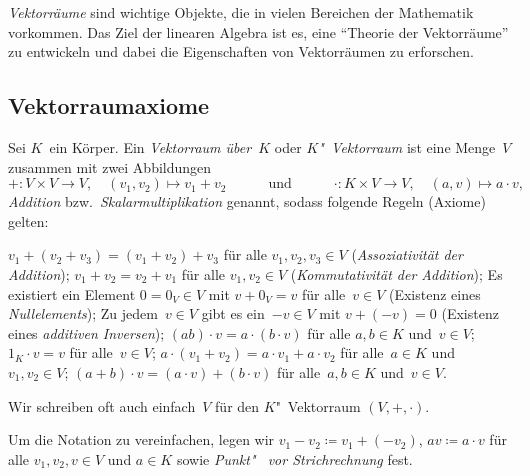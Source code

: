 \documentclass[a4paper]{article}
\begin{document}
\emph{Vektorräume} sind wichtige Objekte, die in vielen Bereichen der Mathematik vorkommen. Das Ziel der linearen Algebra ist es, eine "`Theorie der Vektorräume"' zu entwickeln und dabei die Eigenschaften von Vektorräumen zu erforschen.

\subsection{Vektorraumaxiome}

\begin{definition}[Vektorraum]
    Sei $K$~ein Körper.  Ein \emph{Vektorraum über~$K$} oder \emph{$K$"~Vektorraum} ist eine Menge~$V$ zusammen mit zwei Abbildungen
    \begin{equation*}
        +\colon V \times V \to V,\quad (v_1, v_2) \mapsto v_1+v_2 \quad\qquad\text{und}\qquad\quad \cdot\colon K \times V \to V,\quad (a, v) \mapsto a\cdot v,
    \end{equation*}
    \emph{Addition} bzw.\ \emph{Skalarmultiplikation} genannt, sodass folgende Regeln (Axiome) gelten:
    \begin{enumerate}[leftmargin=*, widest=(SM0)]
         $v_1+(v_2+v_3) = (v_1+v_2)+v_3$ für alle $v_1, v_2, v_3 \in V$ (\emph{Assoziativität der Addition});\label{ax:vecspace:aa}
         $v_1+v_2 = v_2+v_1$ für alle $v_1, v_2 \in V$ (\emph{Kommutativität der Addition});\label{ax:vecspace:ac}
         Es existiert ein Element $0 = 0_V \in V$ mit $v + 0_V = v$ für alle~$v \in V$ (Existenz eines \emph{Nullelements});\label{ax:vecspace:an}
         Zu jedem~$v \in V$ gibt es ein~$-v \in V$ mit $v+(-v) = 0$ (Existenz eines \emph{additiven Inversen});\label{ax:vecspace:ai}
         $(ab)\cdot v = a\cdot(b\cdot v)$ für alle $a, b \in K$ und~$v \in V$;\label{ax:vecspace:smcomp}
         $1_K \cdot v = v$ für alle~$v \in V$;\label{ax:vecspace:smn}
         $a\cdot(v_1+v_2) = a\cdot v_1 + a\cdot v_2$ für alle~$a \in K$ und $v_1, v_2 \in V$;\label{ax:vecspace:smdv}
         $(a+b)\cdot v = (a\cdot v)+(b\cdot v)$ für alle~$a, b \in K$ und~$v \in V$.\label{ax:vecspace:smdf}
    \end{enumerate}
\end{definition}

Wir schreiben oft auch einfach~$V$ für den $K$"~Vektorraum $(V,+,\cdot)$.

\begin{notation}
    Um die Notation zu vereinfachen, legen wir $v_1-v_2 \coloneqq v_1+(-v_2)$, $av \coloneqq a \cdot v$ für alle $v_1, v_2, v \in V$ und $a \in K$ sowie \emph{Punkt"~ vor Strichrechnung} fest.
\end{notation}
\end{document}

